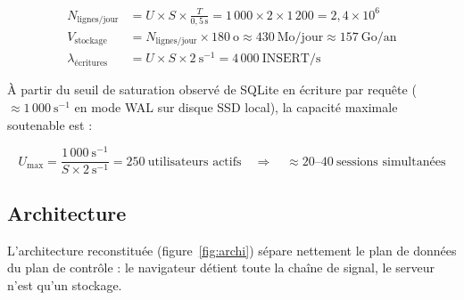 \documentclass[11pt,a4paper]{article}
\begin{document}
\begin{align}
 N_{\text{lignes/jour}} &= U \times S \times \frac{T}{0{,}5\,\text{s}} = 1\,000 \times 2 \times 1\,200
 = 2{,}4 \times 10^{6}
 \label{eq:lignes}\\
 V_{\text{stockage}} &= N_{\text{lignes/jour}} \times 180\ \text{o} \approx 430\ \text{Mo/jour}
 \approx 157\ \text{Go/an}
 \label{eq:stockage}\\
 \lambda_{\text{écritures}} &= U \times S \times 2\ \text{s}^{-1} = 4\,000\ \text{INSERT/s}
 \label{eq:writes}
\end{align}

À partir du seuil de saturation observé de SQLite en écriture par requête ($\approx 1\,000\ \text{s}^{-1}$
en mode WAL sur disque SSD local), la capacité maximale soutenable est :

\begin{equation}
 U_{\max} = \frac{1\,000\ \text{s}^{-1}}{S \times 2\ \text{s}^{-1}} = 250\ \text{utilisateurs actifs}
 \quad\Longrightarrow\quad \approx 20\text{--}40\ \text{sessions simultanées}
 \label{eq:umax}
\end{equation}

\subsection{Architecture}
L'architecture reconstituée (figure~\ref{fig:archi}) sépare nettement le plan de données du plan de
contrôle : le navigateur détient toute la chaîne de signal, le serveur n'est qu'un stockage.
\end{document}
